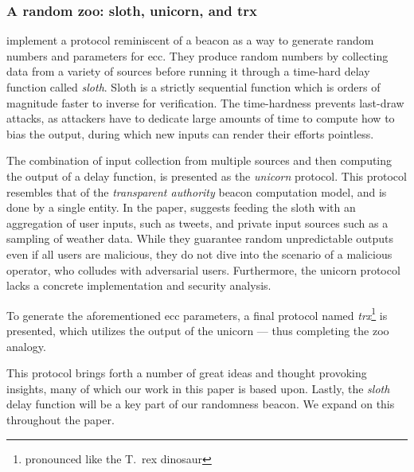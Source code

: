 \subsubsection{A random zoo: sloth, unicorn, and trx}%
\label{sub:random_zoo}
\citet{randomzoo} implement a protocol reminiscent of a beacon as a way to generate random numbers and parameters for \gls{ecc}.
They produce random numbers by collecting data from a variety of sources before running it through a time-hard delay function called \textit{sloth}.
Sloth is a strictly sequential function which is orders of magnitude faster to inverse for verification.
The time-hardness prevents last-draw attacks, as attackers have to dedicate large amounts of time to compute how to bias the output, during which new inputs can render their efforts pointless.

The combination of input collection from multiple sources and then computing the output of a delay function, is presented as the \textit{unicorn} protocol.
This protocol resembles that of the \emph{transparent authority} beacon computation model, and is done by a single entity.
In the paper, \citeauthor{randomzoo} suggests feeding the sloth with an aggregation of user inputs, such as tweets, and private input sources such as a sampling of weather data.
While they guarantee random unpredictable outputs even if all users are malicious, they do not dive into the scenario of a malicious operator, who colludes with adversarial users.
Furthermore, the unicorn protocol lacks a concrete implementation and security analysis.

To generate the aforementioned \gls{ecc} parameters, a final protocol named \textit{trx}\footnote{pronounced like the T.\ rex dinosaur} is presented, which utilizes the output of the unicorn --- thus completing the zoo analogy.

This protocol brings forth a number of great ideas and thought provoking insights, many of which our work in this paper is based upon.
Lastly, the \emph{sloth} delay function will be a key part of our randomness beacon.
We expand on this throughout the paper.
